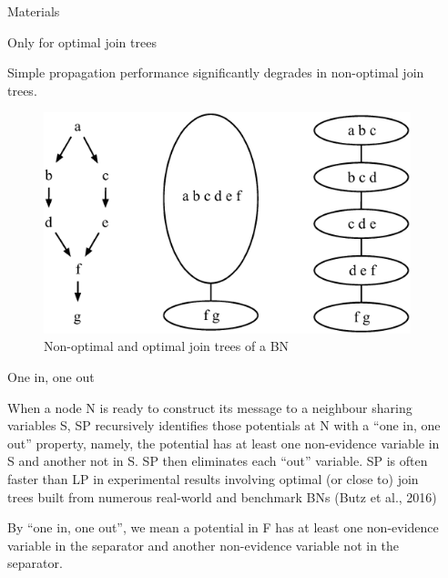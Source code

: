 \documentclass[final]{beamer}
\newlength{\onecolwid}
\newlength{\twocolwid}
\begin{document}
\begin{frame}[t]
\begin{columns}[t]
\begin{column}{\twocolwid}
\begin{columns}[t,totalwidth=\twocolwid]
\begin{column}{\onecolwid}
\begin{block}{Materials}
\end{block}

\begin{alertblock}{Only for optimal join trees}

Simple propagation performance significantly degrades in non-optimal join trees. 

\end{alertblock} 

\begin{figure}
\includegraphics[width=0.8\linewidth]{optimal.png}
\caption{Non-optimal and optimal join trees of a BN}
\end{figure}

\begin{block}{One in, one out}

When a node N is ready to construct its message to a neighbour sharing
variables S, SP recursively identifies those potentials at N with a “one in, one out” property, namely,
the potential has at least one non-evidence variable in S and another not in S. SP then eliminates
each “out” variable. SP is often faster than LP in experimental results involving optimal (or close
to) join trees built from numerous real-world and benchmark BNs (Butz et al., 2016)

By “one in, one out”, we mean a
potential in F has at least one non-evidence variable in the separator and another non-evidence
variable not in the separator.



\end{block}


\end{column} %

\begin{column}{\onecolwid}\vspace{-.6in} %


\end{column}
\end{columns}
\end{column}
\end{columns}
\end{frame}
\end{document}
